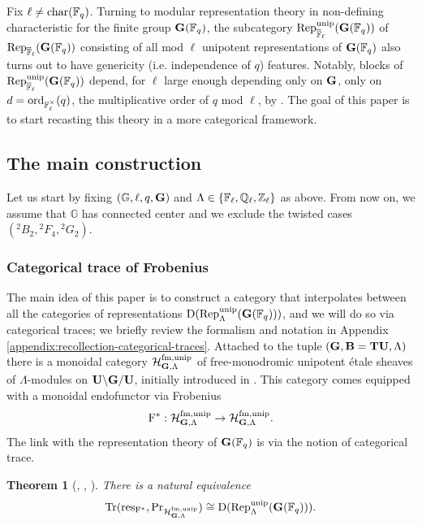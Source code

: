 \documentclass[a4paper, 10pt, oneside, reqno]{amsart}
\theoremstyle{plain}
\newtheorem{thm}{Theorem}[subsection]
\theoremstyle{definition}
\theoremstyle{remark}
\newcommand{\Gbb}{\mathbb{G}}
\newcommand{\fm}{\mathrm{fm}}
\newcommand{\Prr}{\mathrm{Pr}}
\newcommand{\restr}{\mathrm{res}}
\begin{document}
Fix $\ell \neq \mathrm{char}(\mathbb{F}_q)$. Turning to modular representation theory in non-defining characteristic for the finite group $\mathbf{G}(\mathbb{F}_q)$, the subcategory $\mathrm{Rep}^{\mathrm{unip}}_{\overline{\mathbb{F}}_{\ell}}(\mathbf{G}(\mathbb{F}_q))$ of $\mathrm{Rep}_{\overline{\mathbb{F}}_{\ell}}(\mathbf{G}(\mathbb{F}_q))$ consisting of all mod $\ell$ unipotent representations of $\mathbf{G}(\mathbb{F}_q)$ also turns out to have genericity (i.e. independence of $q$) features. Notably, blocks of $\mathrm{Rep}^{\mathrm{unip}}_{\overline{\mathbb{F}}_{\ell}}(\mathbf{G}(\mathbb{F}_q))$ depend, for $\ell$ large enough depending only on $\mathbf{G}$, only on $d = \mathrm{ord}_{\mathbb{F}_{\ell}^{\times}}(q)$, the multiplicative order of $q$ mod $\ell$, by \cite{BroueMalleMichel}. The goal of this paper is to start recasting this theory in a more categorical framework.

\subsection{The main construction}

Let us start by fixing $(\Gbb, \ell, q, \Gbf)$ and $\Lambda \in \{\mathbb{F}_{\ell}, \mathbb{Q}_{\ell}, \mathbb{Z}_{\ell}\}$ as above. From now on, we assume that $\Gbb$ has connected center and  we exclude the twisted cases $({^2}B_2, {^2}F_4, {^2}G_2)$.

\subsubsection{Categorical trace of Frobenius}

 The main idea of this paper is to construct a category that interpolates between all the categories of representations $\mathrm{D}(\mathrm{Rep}^{\mathrm{unip}}_{\Lambda}(\mathbf{G}(\mathbb{F}_q)))$, and we will do so via categorical traces; we briefly review the formalism and notation in Appendix \ref{appendix:recollection-categorical-traces}. Attached to the tuple $(\mathbf{G}, \mathbf{B} = \mathbf{T}\mathbf{U}, \Lambda)$ there is a monoidal category $\Hcal^{\fm, \unip}_{\Gbf, \Lambda}$ of free-monodromic unipotent étale sheaves of $\Lambda$-modules on $\mathbf{U} \backslash \mathbf{G}/\mathbf{U}$, initially introduced in \cite{BezYun}. This category comes equipped with a monoidal endofunctor via Frobenius
$$\Frob^* : \Hcal^{\fm, \unip}_{\Gbf, \Lambda} \to \Hcal^{\fm, \unip}_{\Gbf, \Lambda}.$$
The link with the representation theory of $\mathbf{G}(\mathbb{F}_q)$ is via the notion of categorical trace. 

\begin{thm}[\cite{EteveFreeMono}, \cite{ZhuCategoricalTame}, \cite{GaitsgoryRozemblyumVarshavsky}]
There is a natural equivalence 
$$\Tr(\restr_{\Frob^*}, \Prr_{\Hcal^{\fm, \unip}_{\Gbf, \Lambda}}) \cong \DD(\Rep_{\Lambda}^{\unip}(\Gbf(\Fq))).$$
\end{thm} 
\end{document}

